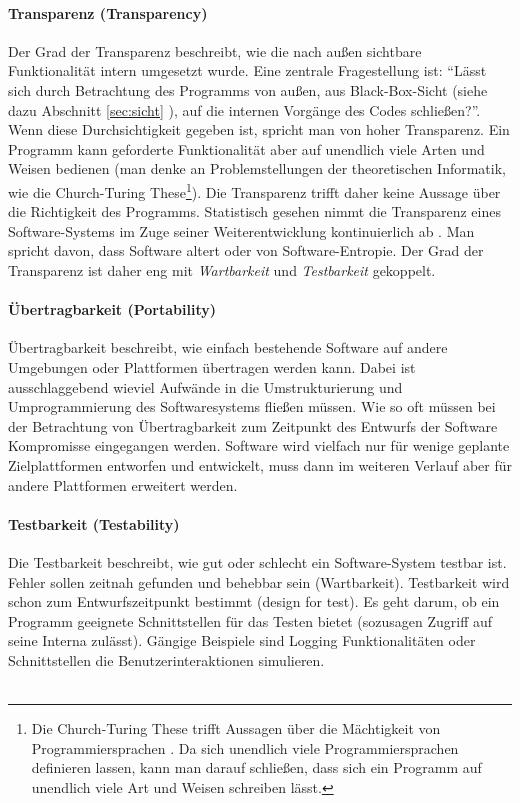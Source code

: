 \paragraph{Transparenz (Transparency)} Der Grad der Transparenz beschreibt, wie die nach außen sichtbare Funktionalität intern umgesetzt wurde. Eine zentrale Fragestellung ist: ``Lässt sich durch Betrachtung des Programms von außen, aus Black-Box-Sicht (siehe dazu Abschnitt \ref{sec:sicht} ), auf die internen Vorgänge des Codes schließen?''. Wenn diese Durchsichtigkeit gegeben ist, spricht man von hoher Transparenz. Ein Programm kann geforderte Funktionalität aber auf unendlich viele Arten und Weisen bedienen (man denke an Problemstellungen der theoretischen Informatik, wie die Church-Turing These\footnote{Die Church-Turing These trifft Aussagen über die Mächtigkeit von Programmiersprachen \cite{hoffmann_theoretische_2011}. Da sich unendlich viele Programmiersprachen definieren lassen, kann man darauf schließen, dass sich ein Programm auf unendlich viele Art und Weisen schreiben lässt.}). Die Transparenz trifft daher keine Aussage über die Richtigkeit des Programms. Statistisch gesehen nimmt die Transparenz eines Software-Systems im Zuge seiner Weiterentwicklung kontinuierlich ab \cite{hoffmann_software-qualitat_2013}. Man spricht davon, dass Software altert oder von Software-Entropie. Der Grad der Transparenz ist daher eng mit \textit{Wartbarkeit} und \textit{Testbarkeit} gekoppelt. 

\paragraph{Übertragbarkeit (Portability)} Übertragbarkeit beschreibt, wie einfach bestehende Software auf andere Umgebungen oder Plattformen übertragen werden kann. Dabei ist ausschlaggebend wieviel Aufwände in die Umstrukturierung und Umprogrammierung des Softwaresystems fließen müssen. Wie so oft müssen bei der Betrachtung von Übertragbarkeit zum Zeitpunkt des Entwurfs der Software Kompromisse eingegangen werden. Software wird vielfach nur für wenige geplante Zielplattformen entworfen und entwickelt, muss dann im weiteren Verlauf aber für andere Plattformen erweitert werden.

\paragraph{Testbarkeit (Testability)} Die Testbarkeit beschreibt, wie gut oder schlecht ein Software-System testbar ist. Fehler sollen zeitnah gefunden und behebbar sein (Wartbarkeit). Testbarkeit wird schon zum Entwurfszeitpunkt bestimmt (design for test). Es geht darum, ob ein Programm geeignete Schnittstellen für das Testen bietet (sozusagen Zugriff auf seine Interna zulässt). Gängige Beispiele sind Logging Funktionalitäten oder Schnittstellen die Benutzerinteraktionen simulieren.
\\\\


